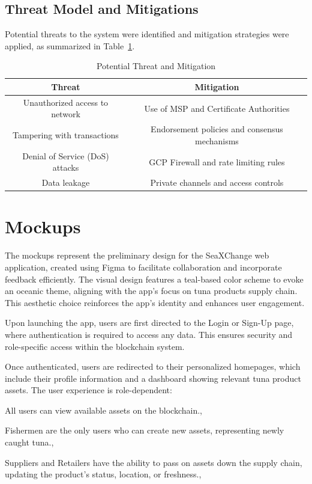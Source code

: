 \subsection{Threat Model and Mitigations}
Potential threats to the system were identified and mitigation strategies were applied, as summarized in Table~\ref{tab:threat}.
\begin{table}[h]
	\centering
	\begin{tabular}{|c|c|}
		\hline
		\textbf{Threat} & \textbf{Mitigation} \\
		\hline
		Unauthorized access to network & Use of MSP and Certificate Authorities \\
		\hline
		Tampering with transactions & Endorsement policies and consensus mechanisms \\
		\hline
		Denial of Service (DoS) attacks & GCP Firewall and rate limiting rules \\
		\hline
		Data leakage & Private channels and access controls \\
		\hline
	\end{tabular}
	\caption{Potential Threat and Mitigation}
	\label{tab:threat}
\end{table}


\section{Mockups}
The mockups represent the preliminary design for the SeaXChange web application, created using Figma to facilitate collaboration and incorporate feedback efficiently. The visual design features a teal-based color scheme to evoke an oceanic theme, aligning with the app’s focus on tuna products supply chain. This aesthetic choice reinforces the app’s identity and enhances user engagement.

Upon launching the app, users are first directed to the Login or Sign-Up page, where authentication is required to access any data. This ensures security and role-specific access within the blockchain system.

Once authenticated, users are redirected to their personalized homepages, which include their profile information and a dashboard showing relevant tuna product assets. The user experience is role-dependent:

\item All users can view available assets on the blockchain.,
\item Fishermen are the only users who can create new assets, representing newly caught tuna.,
\item Suppliers and Retailers have the ability to pass on assets down the supply chain, updating the product's status, location, or freshness.,

